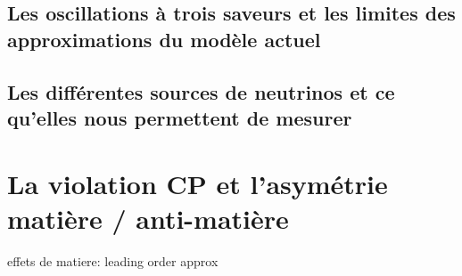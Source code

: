         \subsection{Les oscillations à trois saveurs et les limites des approximations du modèle actuel}\label{sec::oscillations}
            
            \cite{Nunokawa2007}
        
        \subsection{Les différentes sources de neutrinos et ce qu'elles nous permettent de mesurer}
    
    \section{La violation CP et l'asymétrie matière / anti-matière}\label{sec::CP_violation}
        effets de matiere: \cite{Wolfenstein1978,Mikheyev1986}
        leading order approx \cite{Marciano2006}